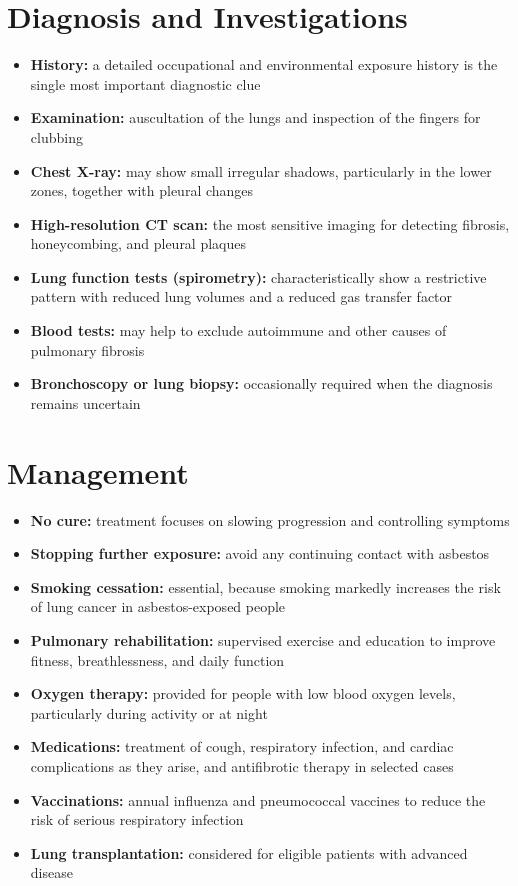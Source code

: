 \section*{Diagnosis and Investigations}
\begin{itemize}
    \item \textbf{History:} a detailed occupational and environmental exposure history is the single most important diagnostic clue
    \item \textbf{Examination:} auscultation of the lungs and inspection of the fingers for clubbing
    \item \textbf{Chest X-ray:} may show small irregular shadows, particularly in the lower zones, together with pleural changes
    \item \textbf{High-resolution CT scan:} the most sensitive imaging for detecting fibrosis, honeycombing, and pleural plaques
    \item \textbf{Lung function tests (spirometry):} characteristically show a restrictive pattern with reduced lung volumes and a reduced gas transfer factor
    \item \textbf{Blood tests:} may help to exclude autoimmune and other causes of pulmonary fibrosis
    \item \textbf{Bronchoscopy or lung biopsy:} occasionally required when the diagnosis remains uncertain
\end{itemize}

\section*{Management}
\begin{itemize}
    \item \textbf{No cure:} treatment focuses on slowing progression and controlling symptoms
    \item \textbf{Stopping further exposure:} avoid any continuing contact with asbestos
    \item \textbf{Smoking cessation:} essential, because smoking markedly increases the risk of lung cancer in asbestos-exposed people
    \item \textbf{Pulmonary rehabilitation:} supervised exercise and education to improve fitness, breathlessness, and daily function
    \item \textbf{Oxygen therapy:} provided for people with low blood oxygen levels, particularly during activity or at night
    \item \textbf{Medications:} treatment of cough, respiratory infection, and cardiac complications as they arise, and antifibrotic therapy in selected cases
    \item \textbf{Vaccinations:} annual influenza and pneumococcal vaccines to reduce the risk of serious respiratory infection
    \item \textbf{Lung transplantation:} considered for eligible patients with advanced disease
\end{itemize}

